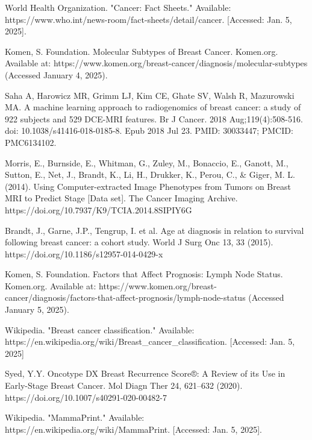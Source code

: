 \documentclass[conference]{IEEEtran}
\begin{document}
\begin{thebibliography}{00}

 World Health Organization. "Cancer: Fact Sheets." Available: https://www.who.int/news-room/fact-sheets/detail/cancer. [Accessed: Jan. 5, 2025].

 Komen, S. Foundation. Molecular Subtypes of Breast Cancer. Komen.org. Available at: https://www.komen.org/breast-cancer/diagnosis/molecular-subtypes (Accessed January 4, 2025).

 Saha A, Harowicz MR, Grimm LJ, Kim CE, Ghate SV, Walsh R, Mazurowski MA. A machine learning approach to radiogenomics of breast cancer: a study of 922 subjects and 529 DCE-MRI features. Br J Cancer. 2018 Aug;119(4):508-516. doi: 10.1038/s41416-018-0185-8. Epub 2018 Jul 23. PMID: 30033447; PMCID: PMC6134102.

 Morris, E., Burnside, E., Whitman, G., Zuley, M., Bonaccio, E., Ganott, M., Sutton, E., Net, J., Brandt, K., Li, H., Drukker, K., Perou, C., \& Giger, M. L. (2014). Using Computer-extracted Image Phenotypes from Tumors on Breast MRI to Predict Stage [Data set]. The Cancer Imaging Archive. https://doi.org/10.7937/K9/TCIA.2014.8SIPIY6G

 Brandt, J., Garne, J.P., Tengrup, I. et al. Age at diagnosis in relation to survival following breast cancer: a cohort study. World J Surg Onc 13, 33 (2015). https://doi.org/10.1186/s12957-014-0429-x

 Komen, S. Foundation. Factors that Affect Prognosis: Lymph Node Status. Komen.org. Available at: https://www.komen.org/breast-cancer/diagnosis/factors-that-affect-prognosis/lymph-node-status (Accessed January 5, 2025).

 Wikipedia. "Breast cancer classification." Available: https://en.wikipedia.org/wiki/Breast\_cancer\_classification. [Accessed: Jan. 5, 2025]

 Syed, Y.Y. Oncotype DX Breast Recurrence Score®: A Review of its Use in Early-Stage Breast Cancer. Mol Diagn Ther 24, 621–632 (2020). https://doi.org/10.1007/s40291-020-00482-7

 Wikipedia. "MammaPrint." Available: https://en.wikipedia.org/wiki/MammaPrint. [Accessed: Jan. 5, 2025].

\end{thebibliography}
\end{document}
